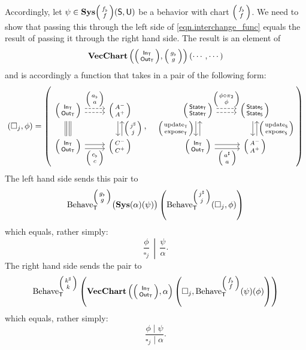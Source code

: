 \documentclass[DynamicalBook]{subfiles}
\begin{document}
\begin{itemize}
Accordingly, let $\psi \in \Cat{Sys}\littlelens{f_{\flat}}{f}(\Sys{S}, \Sys{U})$
be a behavior with chart $\littlelens{f_{\flat}}{f}$. We need to show that
passing this through the left side of \cref{eqn.interchange_func} equals the
result of passing it through the right hand side. The result is an element of
\[
\Cat{Vec}\Cat{Chart}\left( \littlelens{\In{T}}{\Out{T}},
      \littlelens{g_{\flat}}{g} \right)\left(\cdots, \cdots  \right)
\]
and is accordingly a function that takes in a pair of the following form:
\[
  (\square_j, \phi) = \left(  
    \begin{tikzcd}[ampersand replacement = \&]
      \lens{\In{T}}{\Out{T}} \ar[r, shift left, dashed, "\lens{a_{\flat}}{a}"] \ar[r, dashed, shift right] \ar[d, shift right,
      equals] \ar[d, shift left, equals] \&
      \lens{A^-}{A^+} \ar[d, shift left, leftarrow,
      "\lens{j^{\sharp}}{j}"] \ar[d, shift right]\\
      \lens{\In{T}}{\Out{T}} \ar[r, shift right, "\lens{c_{\flat}}{c}"'] \ar[r,
      shift left] \& \lens{C^-}{C^+}
    \end{tikzcd}, \quad
    \begin{tikzcd}[ampersand replacement = \&]
      \lens{\State{T}}{\State{T}} \ar[r, shift left, dashed, "\lens{\phi \circ
        \pi_2}{\phi}"] \ar[r, dashed, shift right] \ar[d, shift right,
      "\lens{\update{T}}{\expose{T}}"'] \ar[d, shift left, leftarrow] \&
      \lens{\State{S}}{\State{S}} \ar[d, shift left, leftarrow,
      "\lens{\update{S}}{\expose{S}}"] \ar[d, shift right]\\
      \lens{\In{T}}{\Out{T}} \ar[r, shift right, "\lens{a^{\sharp}}{a}"'] \ar[r,
      shift left] \& \lens{A^-}{A^+}
    \end{tikzcd}
\right)
\]
The left hand side sends this pair to 
\[
\Fun{Behave}_{\Sys{T}}^{\littlelens{g_{\flat}}{g}}
  \big( \Cat{Sys}(\alpha)(\psi) \big)\left(
    \Fun{Behave}_{\Sys{T}}^{\littlelens{j^{\sharp}}{j}}(\square_j, \phi) \right) 
\]
which equals, rather simply:
\[
\left. \frac{\phi}{\square_j} \,\middle|\, \frac{\psi}{\alpha} \right. .
\]
The right hand side sends the pair to
\[
\Fun{Behave}_{\Sys{T}}^{\littlelens{k^{\sharp}}{k}}\left(
  \Cat{Vec}\Cat{Chart}\left( \littlelens{\In{T}}{\Out{T}}, \alpha \right)\left(
    \square_j, \Fun{Behave}_{\Sys{T}}^{\littlelens{f_{\flat}}{f}}(\psi)(\phi) \right) \right)
\]
which equals, rather simply:
\[
\frac{\phi \mid \psi}{\square_j \mid \alpha}.
\]



\end{itemize}
\end{document}
